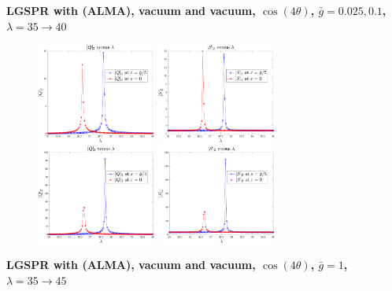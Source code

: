 \documentclass[11pt]{article}
\begin{document}
\newpage
\noindent\textbf{\large LGSPR  with (ALMA), vacuum and vacuum, $\cos(4\theta)$, $\bar{g} = 0.025, 0.1$, $\lambda=35 \to 40$}
\begin{figure}[H]
	\centering
	\subfigure
	{\includegraphics[width=0.35\textwidth]
		{fig_LGSPR_IIO_Qu_shift_cos4_gbar25_VACUUM_ALMA.pdf}}
	\quad
	\subfigure 
	{\includegraphics[width=0.35\textwidth]
		{fig_LGSPR_IIO_Sw_shift_cos4_gbar25_VACUUM_ALMA.pdf}}
	\\
	\subfigure
	{\includegraphics[width=0.35\textwidth]
		{fig_LGSPR_IIO_Qu_shift_cos4_gbar100_VACUUM_ALMA.pdf}}
	\quad
	\subfigure 
	{\includegraphics[width=0.35\textwidth]
		{fig_LGSPR_IIO_Sw_shift_cos4_gbar100_VACUUM_ALMA.pdf}}
\end{figure}	
\noindent\textbf{\large LGSPR  with (ALMA), vacuum and vacuum, $\cos(4\theta)$, $\bar{g}=1$, $\lambda=35 \to 45$}
\end{document}
